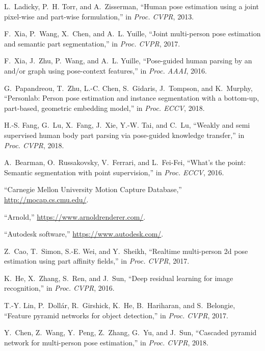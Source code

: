 \documentclass[final]{IEEEtran}
\begin{document}
{\begin{minipage}{\textwidth}
\begin{thebibliography}{1}
L.~Ladicky, P.~H. Torr, and A.~Zisserman, ``Human pose estimation using a joint
  pixel-wise and part-wise formulation,'' in \emph{Proc. CVPR}, 2013.

F.~Xia, P.~Wang, X.~Chen, and A.~L. Yuille, ``Joint multi-person pose
  estimation and semantic part segmentation,'' in \emph{Proc. CVPR}, 2017.

F.~Xia, J.~Zhu, P.~Wang, and A.~L. Yuille, ``Pose-guided human parsing by an
  and/or graph using pose-context features,'' in \emph{Proc. AAAI}, 2016.

G.~Papandreou, T.~Zhu, L.-C. Chen, S.~Gidaris, J.~Tompson, and K.~Murphy,
  ``Personlab: Person pose estimation and instance segmentation with a
  bottom-up, part-based, geometric embedding model,'' in \emph{Proc. ECCV},
  2018.

H.-S. Fang, G.~Lu, X.~Fang, J.~Xie, Y.-W. Tai, and C.~Lu, ``Weakly and semi
  supervised human body part parsing via pose-guided knowledge transfer,'' in
  \emph{Proc. CVPR}, 2018.

A.~Bearman, O.~Russakovsky, V.~Ferrari, and L.~Fei-Fei, ``What’s the point:
  Semantic segmentation with point supervision,'' in \emph{Proc. ECCV}, 2016.

``{Carnegie Mellon University Motion Capture Database},''
  \url{http://mocap.cs.cmu.edu/}.

``{Arnold},'' \url{https://www.arnoldrenderer.com/}.

``{Autodesk software},'' \url{https://www.autodesk.com/}.

Z.~Cao, T.~Simon, S.-E. Wei, and Y.~Sheikh, ``Realtime multi-person 2d pose
  estimation using part affinity fields,'' in \emph{Proc. CVPR}, 2017.

K.~He, X.~Zhang, S.~Ren, and J.~Sun, ``Deep residual learning for image
  recognition,'' in \emph{Proc. CVPR}, 2016.

T.-Y. Lin, P.~Doll{\'a}r, R.~Girshick, K.~He, B.~Hariharan, and S.~Belongie,
  ``Feature pyramid networks for object detection,'' in \emph{Proc. CVPR},
  2017.

Y.~Chen, Z.~Wang, Y.~Peng, Z.~Zhang, G.~Yu, and J.~Sun, ``Cascaded pyramid
  network for multi-person pose estimation,'' in \emph{Proc. CVPR}, 2018.


\end{thebibliography}
\end{minipage}}
\end{document}

